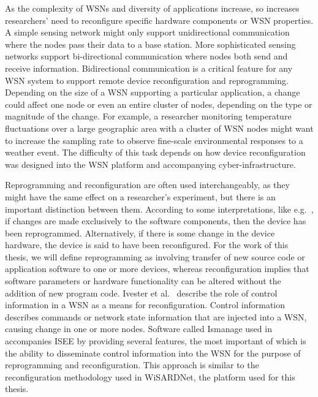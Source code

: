 As the complexity of WSNs and diversity of applications increase, so increases researchers' need to reconfigure specific hardware components or WSN properties. A simple sensing network might only support unidirectional communication where the nodes pass their data to a base station. More sophisticated sensing networks support bi-directional communication where nodes both send and receive information. Bidirectional communication is a critical feature for any WSN system to support remote device reconfiguration and reprogramming. Depending on the size of a WSN supporting a particular application, a change could affect one node or even an entire cluster of nodes, depending on the type or magnitude of the change. For example, a researcher monitoring temperature fluctuations over a large geographic area with a cluster of WSN nodes might want to increase the sampling rate to observe fine-scale environmental responses to a weather event. The difficulty of this task depends on how device reconfiguration was designed into the WSN platform and accompanying cyber-infrastructure.

Reprogramming and reconfiguration are often used interchangeably, as they might have the same effect on a researcher's experiment, but there is an important distinction between them. According to some interpretations, like e.g.~\cite{Eronu}, if changes are made exclusively to the software components, then the device has been reprogrammed. Alternatively, if there is some change in the device hardware, the device is said to have been reconfigured. For the work of this thesis, we will define  reprogramming as involving transfer of new source code or application software to one or more devices, whereas reconfiguration implies that software parameters or hardware functionality can be altered without the addition of new program code. Ivester et al.~\cite{Ivester} describe the role of control information in a WSN as a means for reconfiguration.  Control information describes commands or network state information that are injected into a WSN, causing change in one or more nodes. Software called Ismanage used in~\cite{Ivester} accompanies ISEE by providing several features, the most important of which is the ability to disseminate control information into the WSN for the purpose of reprogramming and reconfiguration. This approach is similar to the reconfiguration methodology used in WiSARDNet, the platform used for this thesis.

